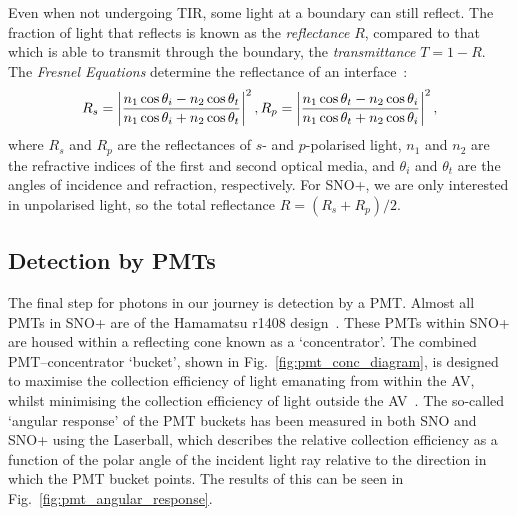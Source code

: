 Even when not undergoing TIR, some light at a boundary can still reflect. The fraction of light that reflects is known as the \textit{reflectance} $R$, compared to that which is able to transmit through the boundary, the \textit{transmittance} $T=1-R$. The \textit{Fresnel Equations} determine the reflectance of an interface~\cite{}:%
\begin{equation}
    R_{s} = \left|\frac{n_{1}\cos{\theta_{i}}-n_{2}\cos{\theta_{t}}}{n_{1}\cos{\theta_{i}}+n_{2}\cos{\theta_{t}}}\right|^{2},\\
    R_{p} = \left|\frac{n_{1}\cos{\theta_{t}}-n_{2}\cos{\theta_{i}}}{n_{1}\cos{\theta_{t}}+n_{2}\cos{\theta_{i}}}\right|^{2},
\end{equation}
where $R_{s}$ and $R_{p}$ are the reflectances of $s$- and $p$-polarised light, $n_{1}$ and $n_{2}$ are the refractive indices of the first and second optical media, and $\theta_{i}$ and $\theta_{t}$ are the angles of incidence and refraction, respectively. For SNO+, we are only interested in unpolarised light, so the total reflectance $R = \left(R_{s}+R_{p}\right)/2$.

\subsection{Detection by PMTs}\label{sec:pmts}
The final step for photons in our journey is detection by a PMT. Almost all PMTs in SNO+ are of the Hamamatsu r1408 design~\cite{}. %
These PMTs within SNO+ are housed within a reflecting cone known as a `concentrator'. The combined PMT--concentrator `bucket', shown in Fig.~\ref{fig:pmt_conc_diagram}, is designed to maximise the collection efficiency of light emanating from within the AV, whilst minimising the collection efficiency of light outside the AV~\cite{}. %
The so-called `angular response' of the PMT buckets has been measured in both SNO and SNO+ using the Laserball, which describes the relative collection efficiency as a function of the polar angle of the incident light ray relative to the direction in which the PMT bucket points. The results of this can be seen in Fig.~\ref{fig:pmt_angular_response}.

